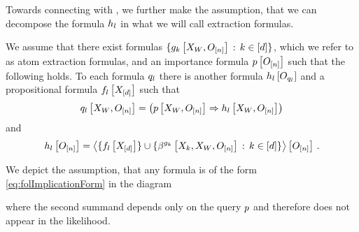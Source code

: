 Towards connecting with \propositionalLogic{}, we further make the assumption, that we can decompose the formula $h_{l}$ in what we will call extraction formulas.

\begin{assumption}
    \label{ass:propositionalHeads}
    We assume that there exist formulas $\{g_{k}\left[X_{W},O_{[n]}\right] \,:\, k\in[d]\}$, which we refer to as atom extraction formulas, and an importance formula $p\left[O_{[n]}\right]$ such that the following holds.
    To each \firstOrderLogic{} formula $q_{l}$ there is another \firstOrderLogic{} formula $h_{l}\left[O_{q_{l}}\right]$ and a propositional formula $f_{l}\left[X_{[d]}\right]$ such that
    \begin{align*}
        q_{l}\left[X_{W},O_{[n]}\right]
        = \left( p\left[X_{W},O_{[n]}\right] \Rightarrow h_{l}\left[X_{W},O_{[n]}\right] \right)
    \end{align*}
    and
    \begin{align*}
        h_{l}\left[O_{[n]}\right] =
        \left\langle 
            \{f_{l}\left[X_{[d]}\right]\} \cup \{\beta^{g_{k}}\left[X_{k},X_{W},O_{[n]}\right]
            \,:\, k\in[d]\}
        \right\rangle \left[ O_{[n]} \right] \, .
    \end{align*}
\end{assumption}

We depict the assumption, that any formula is of the form \eqref{eq:folImplicationForm} in the diagram
\begin{center}
    
\end{center}
where the second summand depends only on the query $p$ and therefore does not appear in the likelihood.




